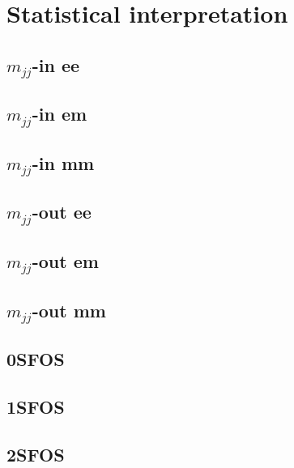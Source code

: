\documentclass[12pt]{article}
\newcommand{\analysispath}{/home/users/phchang/public_html/analysis/www/code/WWWAnalysisRun2/analysis/plots/WWW2017_v4.0.6/test22}
\begin{document}
\clearpage

\section{Statistical interpretation}

\subsection{$m_{jj}$-in ee}
\subsection{$m_{jj}$-in em}
\subsection{$m_{jj}$-in mm}
\subsection{$m_{jj}$-out ee}
\subsection{$m_{jj}$-out em}
\subsection{$m_{jj}$-out mm}
\subsection{0SFOS}
\subsection{1SFOS}
\subsection{2SFOS}
\end{document}
